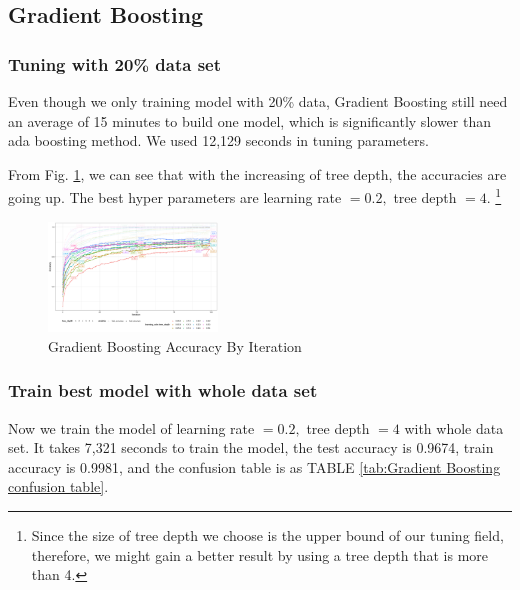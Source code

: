 \documentclass[conference]{IEEEtran}
\begin{document}
\subsection{Gradient Boosting}
\subsubsection{Tuning with 20\% data set}
Even though we only training model with 20\% data, Gradient Boosting still need an average of 15 minutes to build one model, which is significantly slower than ada boosting method. We used 12,129 seconds in tuning parameters. 

From Fig. \ref{Gradient Boosting Accuracy By Iteration}, we can see that with the increasing of tree depth, the accuracies are going up. The best hyper parameters are learning rate $=0.2,$ tree depth $=4$. \footnote{Since the size of tree depth we choose is the upper bound of our tuning field, therefore, we might gain a better result by using a tree depth that is more than 4.}
\begin{figure}[htbp]
\centerline{\includegraphics[width=0.4\textwidth]{figure/Gradient Boosting Accuracy By Iteration.png}}
\caption{Gradient Boosting Accuracy By Iteration}
\label{Gradient Boosting Accuracy By Iteration}
\end{figure}


\subsubsection{Train best model with whole data set}
Now we train the model of learning rate $=0.2,$ tree depth $=4$ with whole data set. It takes 7,321 seconds to train the model, the test accuracy is 0.9674, train accuracy is 0.9981, and the confusion table is as TABLE \ref{tab:Gradient Boosting confusion table}.
\end{document}
